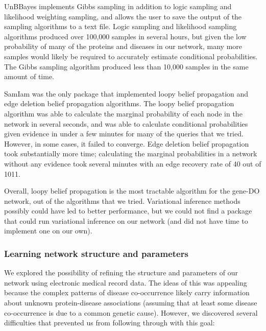 \documentclass[11pt]{article}
\begin{document}
UnBBayes implements Gibbs sampling in addition to logic sampling and likelihood weighting sampling, and allows the user to save the output of the sampling algorithms to a text file. Logic sampling and likelihood sampling algorithms produced over 100,000 samples in several hours, but given the low probability of many of the proteins and diseases in our network, many more samples would likely be required to accurately estimate conditional probabilities. The Gibbs sampling algorithm produced less than 10,000 samples in the same amount of time. 

SamIam was the only package that implemented loopy belief propagation and edge deletion belief propagation algorithms. The loopy belief propagation algorithm was able to calculate the marginal probability of each node in the network in several seconds, and was able to calculate conditional probabilities given evidence in under a few minutes for many of the queries that we tried. However, in some cases, it failed to converge. Edge deletion belief propagation took substantially more time; calculating the marginal probabilities in a network without any evidence took several minutes with an edge recovery rate of 40 out of 1011.

Overall, loopy belief propagation is the most tractable algorithm for the gene-DO network, out of the algorithms that we tried. Variational inference methods \cite{Jaakkola1999,Ng1999} possibly could have led to better performance, but we could not find a package that could run variational inference on our network (and did not have time to implement one on our own).





\subsubsection{Learning network structure and parameters}

We explored the possibility of refining the structure and parameters of our network using electronic medical record data. The ideas of this was appealing because the complex patterns of disease co-occurrence likely carry information about unknown protein-disease associations (assuming that at least some disease co-occurrence is due to a common genetic cause). However, we discovered several difficulties that prevented us from following through with this goal:
\end{document}
